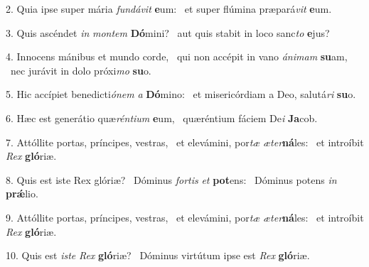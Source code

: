 2. Quia ipse super mária \textit{fun}\textit{dá}\textit{vit} \textbf{e}um: \ast\  et super flúmina præpará\textit{vit} \textbf{e}um.\

3. Quis ascéndet \textit{in} \textit{mon}\textit{tem} \textbf{Dó}mini? \ast\  aut quis stabit in loco sanc\textit{to} \textbf{e}jus?\

4. Innocens mánibus et mundo corde, \dag\  qui non accépit in vano \textit{á}\textit{ni}\textit{mam} \textbf{su}am, \ast\  nec jurávit in dolo próxi\textit{mo} \textbf{su}o.\

5. Hic accípiet benedicti\textit{ó}\textit{nem} \textit{a} \textbf{Dó}mino: \ast\  et misericórdiam a Deo, salutá\textit{ri} \textbf{su}o.\

6. Hæc est generátio quæ\textit{rén}\textit{ti}\textit{um} \textbf{e}um, \ast\  quæréntium fáciem De\textit{i} \textbf{Ja}cob.\

7. Attóllite portas, príncipes, vestras, \dag\  et elevámini, por\textit{tæ} \textit{æ}\textit{ter}\textbf{ná}les: \ast\  et introíbit \textit{Rex} \textbf{gló}riæ.\

8. Quis est iste Rex glóriæ? \dag\  Dóminus \textit{for}\textit{tis} \textit{et} \textbf{pot}ens: \ast\  Dóminus potens \textit{in} \textbf{prǽ}lio.\

9. Attóllite portas, príncipes, vestras, \dag\  et elevámini, por\textit{tæ} \textit{æ}\textit{ter}\textbf{ná}les: \ast\  et introíbit \textit{Rex} \textbf{gló}riæ.\

10. Quis est \textit{is}\textit{te} \textit{Rex} \textbf{gló}riæ? \ast\  Dóminus virtútum ipse est \textit{Rex} \textbf{gló}riæ.\

